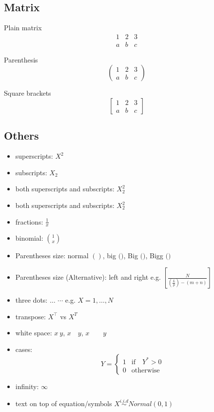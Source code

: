 \documentclass[11pt]{article}
\theoremstyle{quest}
\begin{document}
\subsection{Matrix}

Plain matrix
\begin{equation}
\begin{matrix}
1 & 2 & 3\\
a & b & c
\end{matrix}
\end{equation}

Parenthesis
\begin{equation}
\begin{pmatrix}
1 & 2 & 3\\
a & b & c
\end{pmatrix}
\end{equation}

Square brackets
\begin{equation}
\begin{bmatrix}
1 & 2 & 3\\
a & b & c
\end{bmatrix}
\end{equation}



\subsection{Others}
\begin{itemize}
    \item superscripts: $X^2$ 
    \item subscripts: $X_2$ 
    \item both superscripts and subscripts: $X_2^2$ 
    \item both superscripts and subscripts: $X_2^2$ 
    \item fractions: $\frac{1}{x}$ 
    \item binomial: $\binom{1}{x}$ 
    \item Parentheses size: normal $()$, big $\big(\big)$, Big $\Big(\Big)$, Bigg $\Bigg(\Bigg)$
    \item Parentheses size (Alternative): left and right e.g. $\left[  \frac{ N } { \left( \frac{L}{p} \right)  - (m+n) }  \right]$ 
    \item three dots: $\ldots$ $\cdots$ e.g. $X = 1, \ldots, N$ 
    \item transpose: $X^{\intercal}$ vs $X^{T}$ 
    \item white space: $x\ y$, $x\quad y$, $x\qquad y$
    \item cases: 
      \begin{equation}
          Y = 
          \begin{cases}
            1 &\text{if}\quad Y^* > 0 \\
            0 & \text{otherwise} 
          \end{cases}
      \end{equation}
    \item infinity: $\infty$ 
    \item text on top of equation/symbols $X \stackrel{i.i.d}{\sim} Normal(0, 1)$
\end{itemize}
\end{document}

